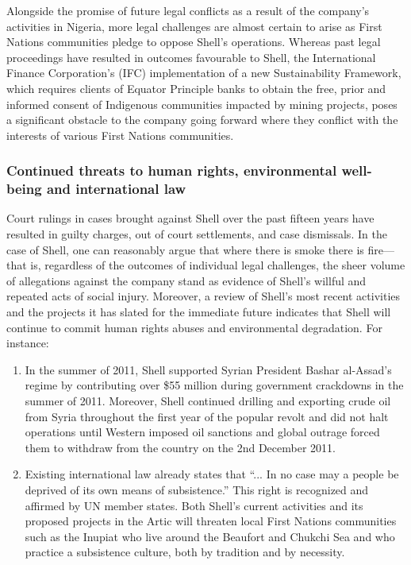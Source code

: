 Alongside the promise of future legal conflicts as a result of the company’s activities in Nigeria, more legal challenges are almost certain to arise as First Nations communities pledge to oppose Shell’s operations. Whereas past legal proceedings have resulted in outcomes favourable to Shell, the International Finance Corporation’s (IFC) implementation of a new Sustainability Framework, which requires clients of Equator Principle banks to obtain the free, prior and informed consent of Indigenous communities impacted by mining projects, poses a significant obstacle to the company going forward where they conflict with the interests of various First Nations communities.






	\subsubsection{Continued threats to human rights, environmental well-being and international law}
	

	
Court rulings in cases brought against Shell over the past fifteen years have resulted in guilty charges, out of court settlements, and case dismissals. In the case of Shell, one can reasonably argue that where there is smoke there is fire—that is, regardless of the outcomes of individual legal challenges, the sheer volume of allegations against the company stand as evidence of Shell’s willful and repeated acts of social injury. Moreover, a review of Shell’s most recent activities and the projects it has slated for the immediate future indicates that Shell will continue to commit human rights abuses and environmental degradation. For instance:
\begin{enumerate}
	\item In the summer of 2011, Shell supported Syrian President Bashar al-Assad’s regime by contributing over \$55 million during government crackdowns in the summer of 2011. Moreover, Shell continued drilling and exporting crude oil from Syria throughout the first year of the popular revolt and did not halt operations until Western imposed oil sanctions and global outrage forced them to withdraw from the country on the 2nd December 2011.
	\item Existing international law already states that ``... In no case may a people be deprived of its own means of subsistence.'' This right is recognized and affirmed by UN member states. Both Shell’s current activities and its proposed projects in the Artic will threaten local First Nations communities such as the Inupiat who live around the Beaufort and Chukchi Sea and who practice a subsistence culture, both by tradition and by necessity.  
\end{enumerate}

